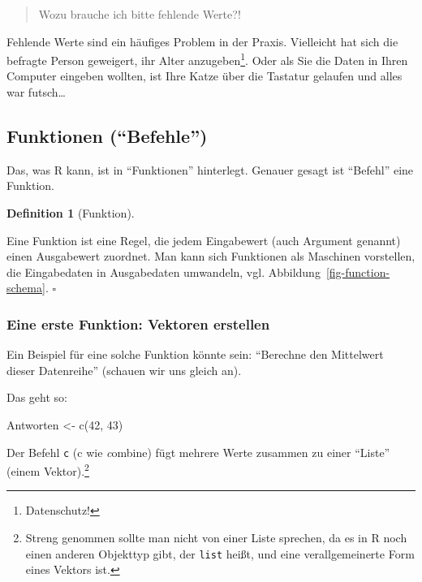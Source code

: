 \documentclass[
  a4paper,
  DIV=11]{scrreprt}
\newenvironment{Shaded}{\begin{snugshade}}{\end{snugshade}}
\newcommand{\DecValTok}[1]{\textcolor[rgb]{0.68,0.00,0.00}{#1}}
\newcommand{\FunctionTok}[1]{\textcolor[rgb]{0.28,0.35,0.67}{#1}}
\newcommand{\NormalTok}[1]{\textcolor[rgb]{0.00,0.23,0.31}{#1}}
\newcommand{\OtherTok}[1]{\textcolor[rgb]{0.00,0.23,0.31}{#1}}
\theoremstyle{definition}
\theoremstyle{definition}
\theoremstyle{definition}
\newtheorem{definition}{Definition}[chapter]
\theoremstyle{remark}
\begin{document}
\begin{quote}
{} Wozu brauche ich bitte fehlende Werte?!
\end{quote}

Fehlende Werte sind ein häufiges Problem in der Praxis. Vielleicht hat
sich die befragte Person geweigert, ihr Alter anzugeben\footnote{Datenschutz!}.
Oder als Sie die Daten in Ihren Computer eingeben wollten, ist Ihre
Katze über die Tastatur gelaufen und alles war futsch\ldots{}

\subsection{Funktionen (``Befehle'')}\label{funktionen-befehle}

Das, was R kann, ist in ``Funktionen'' hinterlegt. Genauer gesagt ist
``Befehl'' eine Funktion.

\begin{definition}[Funktion]\protect\hypertarget{def-fun}{}\label{def-fun}

Eine Funktion ist eine Regel, die jedem Eingabewert (auch Argument
genannt) einen Ausgabewert zuordnet. Man kann sich Funktionen als
Maschinen vorstellen, die Eingabedaten in Ausgabedaten umwandeln, vgl.
Abbildung~\ref{fig-function-schema}. \(\square\)

\end{definition}

\subsubsection{Eine erste Funktion: Vektoren
erstellen}\label{eine-erste-funktion-vektoren-erstellen}

Ein Beispiel für eine solche Funktion könnte sein: ``Berechne den
Mittelwert dieser Datenreihe'' (schauen wir uns gleich an).

Das geht so:

\begin{Shaded}
\begin{Highlighting}[]
\NormalTok{Antworten }\OtherTok{\textless{}{-}} \FunctionTok{c}\NormalTok{(}\DecValTok{42}\NormalTok{, }\DecValTok{43}\NormalTok{)}
\end{Highlighting}
\end{Shaded}

Der Befehl \texttt{c} (c wie \emph{c}ombine) fügt mehrere Werte zusammen
zu einer ``Liste'' (einem Vektor).\footnote{Streng genommen sollte man
  nicht von einer Liste sprechen, da es in R noch einen anderen
  Objekttyp gibt, der \texttt{list} heißt, und eine verallgemeinerte
  Form eines Vektors ist.}
\end{document}
